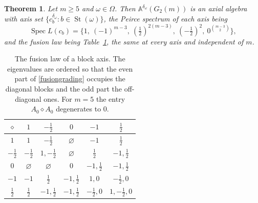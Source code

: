\documentclass[times,11pt,reqno]{amsproc}
\newtheorem{theorem}{Theorem}[section]
\theoremstyle{definition}
\numberwithin{equation}{section}
\def\alg{\mathbb{A}}
\DeclareMathOperator{\Spec}{Spec}
\DeclareMathOperator{\St}{St}
\begin{document}
\begin{theorem}\label{thm:vmaxial}
Let $m\ge5$ and $\omega\in\Omega$. Then $\alg^{\delta_\omega}(G_2(m))$ is
an axial algebra with axis set $\{c_b^{\delta_\omega}:b\in\St(\omega)\}$,
the Peirce spectrum of each axis being
$$
\Spec L(c_b)=\bigl\{1,\ (-1)^{m-3},\ (\tfrac12)^{2(m-3)},\
(-\tfrac12)^{2},\ 0^{\binom{m-3}{2}}\bigr\},
$$
and the fusion law being Table~\ref{tab:fusion}, the same at every axis
and independent of $m$.
\end{theorem}

\begin{table}[h]
\centering
\renewcommand{\arraystretch}{1.2}
\begin{tabular}{c|cc|c|cc}
$\diamond$ & $1$ & $-\tfrac12$ & $0$ & $-1$ & $\tfrac12$\\
\midrule
$1$          & $1$ & $-\tfrac12$ & $\varnothing$ & $-1$ & $\tfrac12$\\
$-\tfrac12$  & $-\tfrac12$ & $1,-\tfrac12$ & $\varnothing$ & $\tfrac12$ & $-1,\tfrac12$\\
\midrule
$0$          & $\varnothing$ & $\varnothing$ & $0$ & $-1,\tfrac12$ & $-1,\tfrac12$\\
\midrule
$-1$         & $-1$ & $\tfrac12$ & $-1,\tfrac12$ & $1,0$ & $-\tfrac12,0$\\
$\tfrac12$   & $\tfrac12$ & $-1,\tfrac12$ & $-1,\tfrac12$ & $-\tfrac12,0$ & $1,-\tfrac12,0$\\
\end{tabular}
\smallskip
\caption{The fusion law of a block axis. The eigenvalues are ordered so that the even part of
\eqref{fusiongrading} occupies the diagonal blocks and the odd part the
off-diagonal ones. For $m=5$ the entry $A_0\diamond A_0$ degenerates
to $0$.}
\label{tab:fusion}
\end{table}
\end{document}
